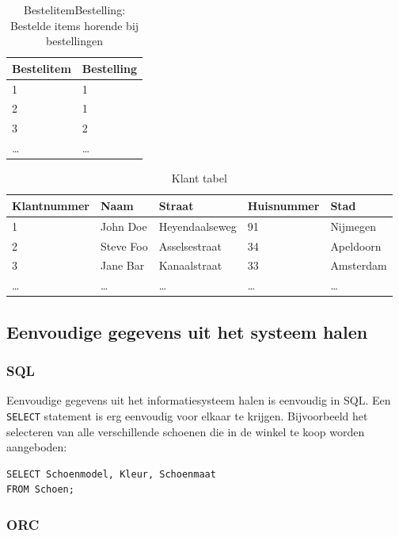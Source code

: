 \documentclass{article}
\begin{document}
\begin{table}[hp]
  \centering
  \begin{tabular}{l|l}
    \textbf{Bestelitem} & \textbf{Bestelling}\\ 
    \hline
    1      & 1      \\
    2      & 1      \\
    3      & 2      \\
    \ldots & \ldots \\
  \end{tabular}
  \caption{BestelitemBestelling: Bestelde items horende bij bestellingen}
  \label{tab:bestelitembestelling}
\end{table}

\begin{table}[hp]
  \centering
  \begin{tabular}{l|l|l|l|l}
    \textbf{Klantnummer} & \textbf{Naam} & \textbf{Straat} & \textbf{Huisnummer} & \textbf{Stad} \\
    \hline
    1 & John Doe & Heyendaalseweg & 91 & Nijmegen \\
    2 & Steve Foo & Asselsestraat & 34 & Apeldoorn \\
    3 & Jane Bar  & Kanaalstraat  & 33 & Amsterdam \\
    \dots & \dots & \dots& \dots& \dots \\
  \end{tabular}
  \caption{Klant tabel}
  \label{tab:klant}
\end{table}

\FloatBarrier
\subsection{Eenvoudige gegevens uit het systeem halen}

\subsubsection{SQL}

Eenvoudige gegevens uit het informatiesysteem halen is eenvoudig in SQL. Een
\verb+SELECT+ statement is erg eenvoudig voor elkaar te krijgen. Bijvoorbeeld
het selecteren van alle verschillende schoenen die in de winkel te koop worden
aangeboden:

\begin{verbatim}
SELECT Schoenmodel, Kleur, Schoenmaat 
FROM Schoen;
\end{verbatim}

\subsubsection{ORC}
\end{document}
